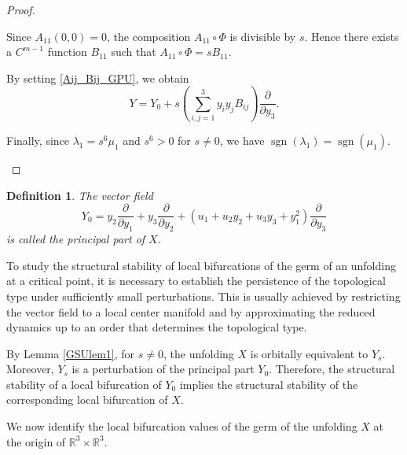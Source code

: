 \documentclass[12pt]{article}
\newtheorem{definition}{Definition}[section]
\newtheorem{remark definition}{Remark Definition}[section]
\begin{document}
\begin{proof}
\begin{enumerate}
		Since $A_{11}(0,0)=0$, the composition $A_{11}\circ\Phi$ is divisible
		by $s$. Hence there exists a $C^{m-1}$ function $B_{11}$ such that
		$A_{11}\circ\Phi=sB_{11}.$
	
	By setting \eqref{Aij_Bij_GPU}, we obtain
		$$
		Y
		=
		Y_0
		+
		s
		\left(
		\sum_{i,j=1}^{3}y_iy_jB_{ij}
		\right)
		\frac{\partial}{\partial y_3}.
		$$
		
		Finally, since $\lambda_1=s^6\mu_1$ and $s^6>0$ for $s\neq 0$, we have
		$\operatorname{sgn}(\lambda_1)=\operatorname{sgn}(\mu_1).$
	\end{enumerate}
\end{proof}

\begin{definition}
	The vector field $$Y_0=y_2\frac{\partial}{\partial y_1}+y_3\frac{\partial}{\partial y_2}+
	\left(
	u_1+u_2y_2+u_3y_3+y_1^2
	\right)
	\frac{\partial}{\partial y_3}$$
	is called the principal part of $X$.
\end{definition}


To study the structural stability of local bifurcations of the germ of an
unfolding at a critical point, it is necessary to establish the persistence
of the topological type under sufficiently small perturbations. This is
usually achieved by restricting the vector field to a local center manifold
and by approximating the reduced dynamics up to an order that determines the
topological type.

By Lemma \ref{GSUlem1}, for $s\neq 0$, the unfolding $X$ is orbitally
equivalent to $Y_s$. Moreover, $Y_s$ is a perturbation of the principal part
$Y_0$. Therefore, the structural stability of a local bifurcation of $Y_0$
implies the structural stability of the corresponding local bifurcation of
$X$.

We now identify the local bifurcation values of the germ of the unfolding
$X$ at the origin of $\mathbb{R}^3\times \mathbb{R}^3$.
\end{document}
